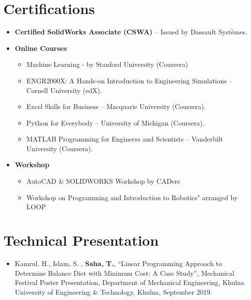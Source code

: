 \documentclass[letterpaper,11pt]{article}
\begin{document}
\section{Certifications}
\begin{itemize}[leftmargin=0.15in]
\item {\textbf{Certified SolidWorks Associate (CSWA)}} – Issued by Dassault Systèmes.
\item \textbf{Online Courses}
\vspace{-5pt}
\begin{itemize}
\item Machine Learning - by Stanford University (Coursera)
\vspace{-3pt}
\item ENGR2000X: A Hands-on Introduction to Engineering Simulations – Cornell University (edX).
\vspace{-3pt}
\item Excel Skills for Business – Macquarie University (Coursera).
\vspace{-3pt}
\item Python for Everybody – University of Michigan (Coursera).
\item MATLAB Programming for Engineers and Scientists – Vanderbilt University (Coursera).
\vspace{-3pt}
\end{itemize}
\item \textbf{Workshop}
\begin{itemize}
\item AutoCAD \& SOLIDWORKS Workshop by CADers
\vspace{-3pt}
\item Workshop on Programming and Introduction to Robotics" arranged by LOOP
\end{itemize}

\end{itemize}

\section{Technical Presentation}
\begin{itemize}
\item Kamrul, H., Islam, S. , \textbf{Saha, T.}, “Linear Programming Approach to Determine Balance Diet with Minimum Cost: A Case Study”, Mechanical Festival Poster Presentation, Department of Mechanical Engineering, Khulna University of Engineering \& Technology, Khulna, September 2019.
\end{itemize}
\end{document}
